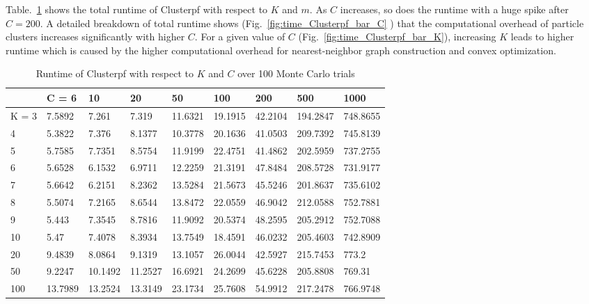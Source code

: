 \documentclass[10pt,letterpaper,final]{article}
\begin{document}
Table.~\ref{tab:runtime_Clusterpf} shows the total runtime of Clusterpf with respect to $K$ and $m$. As $C$ increases, so does the runtime with a huge spike after $C=200$. A detailed breakdown of total runtime shows (Fig.~\ref{fig:time_Clusterpf_bar_C} ) that the computational overhead of particle clusters increases significantly with higher $C$. For a given value of $C$ (Fig.~\ref{fig:time_Clusterpf_bar_K}), increasing $K$ leads to higher runtime which is caused by the higher computational overhead for nearest-neighbor graph construction and convex optimization. 

\begin{table}[h!]
\centering
\begin{tabular}{|l|l|l|l|l|l|l|l|l|}
\hline
      & C = 6   & 10      & 20      & 50      & 100     & 200     & 500      & 1000     \\ \hline
K = 3 & 7.5892  & 7.261   & 7.319   & 11.6321 & 19.1915 & 42.2104 & 194.2847 & 748.8655 \\ \hline
4     & 5.3822  & 7.376   & 8.1377  & 10.3778 & 20.1636 & 41.0503 & 209.7392 & 745.8139 \\ \hline
5     & 5.7585  & 7.7351  & 8.5754  & 11.9199 & 22.4751 & 41.4862 & 202.5959 & 737.2755 \\ \hline
6     & 5.6528  & 6.1532  & 6.9711  & 12.2259 & 21.3191 & 47.8484 & 208.5728 & 731.9177 \\ \hline
7     & 5.6642  & 6.2151  & 8.2362  & 13.5284 & 21.5673 & 45.5246 & 201.8637 & 735.6102 \\ \hline
8     & 5.5074  & 7.2165  & 8.6544  & 13.8472 & 22.0559 & 46.9042 & 212.0588 & 752.7881 \\ \hline
9     & 5.443   & 7.3545  & 8.7816  & 11.9092 & 20.5374 & 48.2595 & 205.2912 & 752.7088 \\ \hline
10    & 5.47    & 7.4078  & 8.3934  & 13.7549 & 18.4591 & 46.0232 & 205.4603 & 742.8909 \\ \hline
20    & 9.4839  & 8.0864  & 9.1319  & 13.1057 & 26.0044 & 42.5927 & 215.7453 & 773.2    \\ \hline
50    & 9.2247  & 10.1492 & 11.2527 & 16.6921 & 24.2699 & 45.6228 & 205.8808 & 769.31   \\ \hline
100   & 13.7989 & 13.2524 & 13.3149 & 23.1734 & 25.7608 & 54.9912 & 217.2478 & 766.9748 \\ \hline
\end{tabular}
\caption{Runtime of Clusterpf with respect to $K$ and $C$ over 100 Monte Carlo trials}
\label{tab:runtime_Clusterpf}
\end{table}
\end{document}
